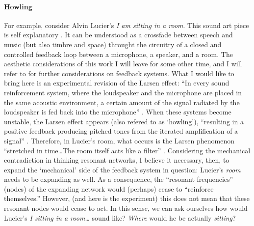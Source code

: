 \paragraph{Howling}
For example, consider Alvin Lucier's \textit{I am sitting in a room}. This sound art piece is self explanatory . It can be understood as a crossfade between speech and music (but also timbre and space) throught the circuitry of a closed and controlled feedback loop between a microphone, a speaker, and a room. The aesthetic considerations of this work I will leave for some other time, and I will refer to \textcite{icmc/bbp2372.2012.006} for further considerations on feedback systems. What I would like to bring here is an experimental revision of the Larsen effect: ``In every sound reinforcement system, where the loudspeaker and the microphone are placed in the same acoustic environment, a certain amount of the signal radiated by the loudspeaker is fed back into the microphone'' \parencite[11]{Kro11:Aco}. When these systems become unstable, the Larsen effect appears (also refered to as `howling'), ``resulting in a positive feedback producing pitched tones from the iterated amplification of a signal'' \parencite[31]{icmc/bbp2372.2012.006}. Therefore, in Lucier's room, what occurs is the Larsen phenomenon ``stretched in time\dots The room itself acts like a filter'' \parencite[34]{icmc/bbp2372.2012.006}. Considering the mechanical contradiction in thinking resonant networks, I believe it necessary, then, to expand the `mechanical' side of the feedback system in question: Lucier's \textit{room} needs to be expanding as well. As a consequence, the ``resonant frequencies'' (nodes) of the expanding network would (perhaps) cease to ``reinforce themselves.'' However, (and here is the experiment) this does not mean that these resonant nodes would cease to act. In this sense, we can ask ourselves how would Lucier's \textit{I sitting in a room\dots} sound like? \textit{Where} would he be actually \textit{sitting}?


